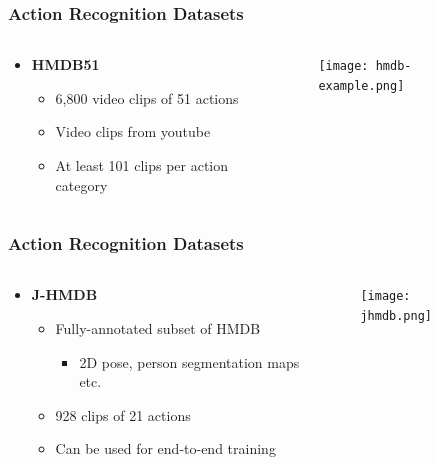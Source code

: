 \documentclass[9pt]{beamer}
\providecommand{\source}{\\ \footnotesize \tugreen{Source:} \footnotemark}
\newenvironment{myframe}[1][]{%
\begin{frame}%
\frametitle{#1}
\setcounter{footnote}{0}


}{%
\end{frame}%
}
\begin{document}
\begin{myframe}[Action Recognition Datasets]
  \begin{columns}[T]
      \begin{column}{.48\textwidth}
          \begin{itemize}
              \item \textbf{HMDB51\footnotemark}
              \begin{itemize}
                  \item 6,800 video clips of 51 actions
                  \item Video clips from youtube
                  \item At least 101 clips per action category
              \end{itemize}
          \end{itemize}
      \end{column}
      \begin{column}{.48\textwidth}
          \begin{figure}
              \texttt{[image: hmdb-example.png]}
              \source
          \end{figure}
      \end{column}
  \end{columns}
\end{myframe}

\begin{myframe}[Action Recognition Datasets]
  \begin{columns}[T]
      \begin{column}{.48\textwidth}
          \begin{itemize}
              \item \textbf{J-HMDB\footnotemark}
              \begin{itemize}
                  \item Fully-annotated subset of HMDB
                  \begin{itemize}
                      \item 2D pose, person segmentation maps etc.
                  \end{itemize}
                  \item 928 clips of 21 actions
                  \item Can be used for end-to-end training
              \end{itemize}
          \end{itemize}
      \end{column}
      \begin{column}{.48\textwidth}
          \begin{figure}
              \texttt{[image: jhmdb.png]}
              \centering
              \source
          \end{figure}
      \end{column}
  \end{columns}
\end{myframe}
\end{document}
